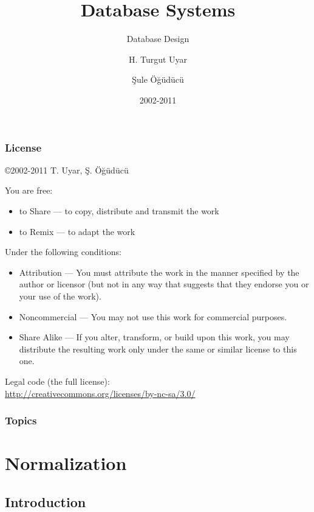 \documentclass[dvipsnames]{beamer}
\title{Database Systems}
\subtitle{Database Design}
\author{H. Turgut Uyar \and Şule Öğüdücü}
\date{2002-2011}
\begin{document}
\begin{frame}
  \titlepage
\end{frame}

\begin{frame}
  \frametitle{License}

  \hfill
  \copyright 2002-2011 T. Uyar, Ş. Öğüdücü

  \vfill
  \begin{tiny}
    You are free:
    \begin{itemize}
      \item to Share — to copy, distribute and transmit the work
      \item to Remix — to adapt the work
    \end{itemize}

    Under the following conditions:
    \begin{itemize}
      \item Attribution — You must attribute the work in the manner specified by
        the author or licensor (but not in any way that suggests that they
        endorse you or your use of the work).

      \item Noncommercial — You may not use this work for commercial purposes.

      \item Share Alike — If you alter, transform, or build upon this work, you
        may distribute the resulting work only under the same or similar license
        to this one.
    \end{itemize}
  \end{tiny}

  \vfill
  Legal code (the full license):\\
  \url{http://creativecommons.org/licenses/by-nc-sa/3.0/}
\end{frame}

\begin{frame}
  \frametitle{Topics}
  \tableofcontents
\end{frame}

\section{Normalization}

\subsection{Introduction}
\end{document}
